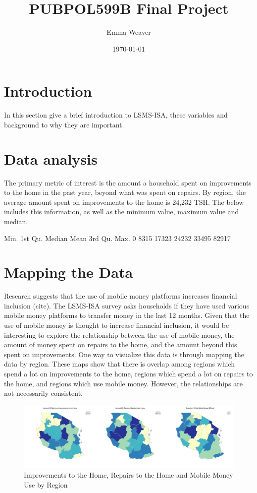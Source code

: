 \documentclass[11pt]{article}
\title{PUBPOL599B Final Project}
\author{
        Emma Weaver\\
}
\date{\today}
\begin{document}


\maketitle

\section{Introduction}\label{intro}
In this section give a brief introduction to LSMS-ISA, these variables and background to why they are important. 

\section{Data analysis}\label{datas}

  The primary metric of interest is the amount a household spent on improvements to the home in the past year, beyond what was spent on repairs. By region, the average amount spent on improvements to the home is 24,232 TSH. The below includes this information, as well as the minimum value, maximum value and median. 
  
\begin{Schunk}
\begin{Soutput}
   Min. 1st Qu.  Median    Mean 3rd Qu.    Max. 
      0    8315   17323   24232   33495   82917 
\end{Soutput}
\end{Schunk}

\section{Mapping the Data}\label{map}
  Research suggests that the use of mobile money platforms increases financial inclusion (cite). The LSMS-ISA survey asks households if they have used various mobile money platforms to transfer money in the last 12 months. Given that the use of mobile money is thought to increase financial inclusion, it would be interesting to explore the relationship between the use of mobile money, the amount of money spent on repairs to the home, and the amount beyond this spent on improvements. One way to visualize this data is through mapping the data by region. These maps show that there is overlap among regions which spend a lot on improvements to the home, regions which spend a lot on repairs to the home, and regions which use mobile money. However, the relationships are not necessarily consistent.
  

\begin{figure}[h]
\centering
\includegraphics{PUBPOL599B_Final_Project_Exec-location}
\caption{Improvements to the Home, Repairs to the Home and Mobile Money Use by Region}
\end{figure}


  
\end{document}
